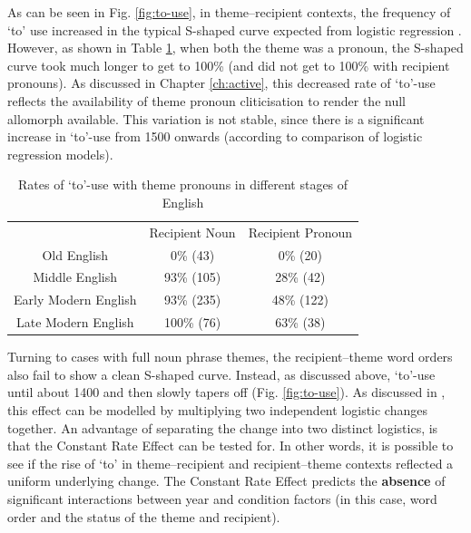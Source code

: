 	As can be seen in Fig. \ref{fig:to-use}, in theme--recipient contexts, the frequency of `to' use increased in the typical S-shaped curve expected from logistic regression \citep{Kroch.1989}. However, as shown in Table \ref{tab:tp-to-rates}, when both the theme was a pronoun, the S-shaped curve took much longer to get to 100\% (and did not get to 100\% with recipient pronouns). As discussed in Chapter \ref{ch:active}, this decreased rate of `to'-use reflects the availability of theme pronoun cliticisation to render the null allomorph available. This variation is not stable, since there is a significant increase in `to'-use from 1500 onwards (according to comparison of logistic regression models). 

	\begin{table}[ht!]
		\begin{tabular}{ccc}
						& Recipient Noun & Recipient Pronoun\\
			Old English		& 0\% (43) & 0\% (20) \\
			Middle English		& 93\% (105) & 28\% (42) \\
			Early Modern English	& 93\% (235) & 48\% (122) \\
			Late Modern English	& 100\% (76) & 63\% (38) \\
		\end{tabular}
		\caption{Rates of `to'-use with theme pronouns in different stages of English}
		\label{tab:tp-to-rates}
	\end{table}

	Turning to cases with full noun phrase themes, the recipient--theme word orders also fail to show a clean S-shaped curve. Instead, as discussed above, `to'-use until about 1400 and then slowly tapers off (Fig. \ref{fig:to-use}). As discussed in \cite{Bacovcin.2016}, this effect can be modelled by multiplying two independent logistic changes together. An advantage of separating the change into two distinct logistics, is that the Constant Rate Effect can be tested for. In other words, it is possible to see if the rise of `to' in theme--recipient and recipient--theme contexts reflected a uniform underlying change. The Constant Rate Effect predicts the \textbf{absence} of significant interactions between year and condition factors (in this case, word order and the status of the theme and recipient). 


